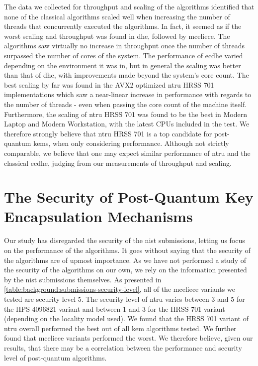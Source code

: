 The data we collected for throughput and scaling of the algorithms identified that none of the classical algorithms scaled well when increasing the number of threads that concurrently executed the algorithms. In fact, it seemed as if the worst scaling and throughput was found in \gls{dhe}, followed by \gls{mceliece}. The algorithms saw virtually no increase in throughput once the number of threads surpassed the number of cores of the system. The performance of \gls{ecdhe} varied depending on the environment it was in, but in general the scaling was better than that of \gls{dhe}, with improvements made beyond the system's core count. The best scaling by far was found in the AVX2 optimized \gls{ntru} HRSS 701 implementations which saw a near-linear increase in performance with regards to the number of threads - even when passing the core count of the machine itself. Furthermore, the scaling of \gls{ntru} HRSS 701 was found to be the best in Modern Laptop and Modern Workstation, with the latest CPUs included in the test. We therefore strongly believe that \gls{ntru} HRSS 701 is a top candidate for \gls{post-quantum} \glspl{kem}, when only considering performance. Although not strictly comparable, we believe that one may expect similar performance of \gls{ntru} and the classical \gls{ecdhe}, judging from our measurements of throughput and scaling.


\section{The Security of Post-Quantum Key Encapsulation Mechanisms}

Our study has disregarded the security of the \gls{nist} submissions, letting us focus on the performance of the algorithms. It goes without saying that the security of the algorithms are of upmost importance. As we have not performed a study of the security of the algorithms on our own, we rely on the information presented by the \gls{nist} submissions themselves. As presented in \ref{table:background:submissions-security-level}, all of the \gls{mceliece} variants we tested are security level 5. The security level of \gls{ntru} varies between 3 and 5 for the HPS 4096821 variant and between 1 and 3 for the HRSS 701 variant (depending on the locality model used). We found that the HRSS 701 variant of \gls{ntru} overall performed the best out of all \gls{kem} algorithms tested. We further found that \gls{mceliece} variants performed the worst. We therefore believe, given our results, that there may be a correlation between the performance and security level of \gls{post-quantum} algorithms.

